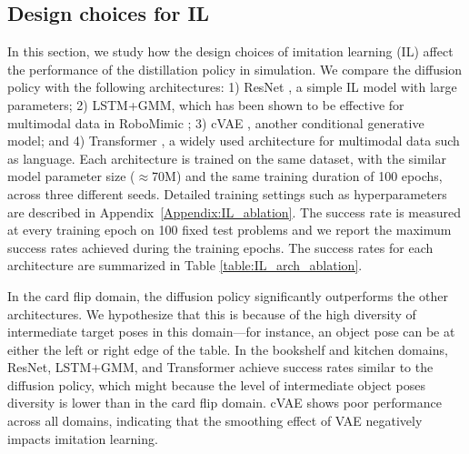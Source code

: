\subsection{Design choices for IL}

In this section, we study how the design choices of imitation learning (IL) affect the performance of the distillation policy in simulation. We compare the diffusion policy \cite{chi2023diffusion} with the following architectures: 1) ResNet \cite{he2016deep}, a simple IL model with large parameters; 2) LSTM+GMM, which has been shown to be effective for multimodal data in RoboMimic \cite{robomimic2021}; 3) cVAE \cite{kingma2013auto}, another conditional generative model; and 4) Transformer \cite{vaswani2017attention}, a widely used architecture for multimodal data such as language. Each architecture is trained on the same dataset, with the similar model parameter size ($\approx$70M) and the same training duration of 100 epochs, across three different seeds. Detailed training settings such as hyperparameters are described in Appendix~\ref{Appendix:IL_ablation}. 
The success rate is measured at every training epoch on 100 fixed test problems and we report the maximum success rates achieved during the training epochs. The success rates for each architecture are summarized in Table \ref{table:IL_arch_ablation}. 

In the card flip domain, the diffusion policy significantly outperforms the other architectures. We hypothesize that this is because of the high diversity of intermediate target poses in this domain—for instance, an object pose can be at either the left or right edge of the table. In the bookshelf and kitchen domains, ResNet, LSTM+GMM, and Transformer achieve success rates similar to the diffusion policy, which might because the level of intermediate object poses diversity is lower than in the card flip domain. cVAE shows poor performance across all domains, indicating that the smoothing effect of VAE negatively impacts imitation learning.


